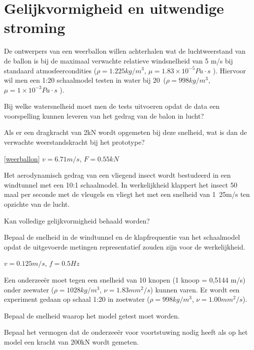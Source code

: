 \chapter{Gelijkvormigheid en uitwendige stroming}
\label{sec:Gelijkvormigheid en uitwendige stroming}
	\begin{toepassing}[*]
		\label{weerballon}
		De ontwerpers van een weerballon willen achterhalen wat de luchtweerstand van de ballon is bij de maximaal verwachte relatieve windsnelheid van 5 m/s bij standaard atmosfeercondities ($\rho = 1.225\unit{kg/m^3}$, $\mu = 1.83\times 10^{-5}\unit{Pa \cdot s}$ ).
		Hiervoor wil men een 1:20 schaalmodel testen in water bij 20\degC\ ($\rho = 998\unit{kg/m^3}$, $\mu = 1\times 10^{-3}\unit{Pa \cdot s}$ ). 
		
		Bij welke watersnelheid moet men de tests uitvoeren opdat de data een voorspelling kunnen leveren van het gedrag van de balon in lucht? 
		
		Als er een dragkracht van 2\unit{kN} wordt opgemeten bij deze snelheid, wat is dan de verwachte weerstandskracht bij het prototype?
	\end{toepassing}
	\begin{antwoord}{\ref{weerballon}}
		$v = 6.71\unit{m/s}$, $F = 0.55\unit{kN}$
	\end{antwoord}
	\begin{toepassing}[*]
		\label{insect}
		Het aerodynamisch gedrag van een vliegend insect wordt bestudeerd in een windtunnel met een 10:1 schaalmodel. In werkelijkheid klappert het insect 50 maal per seconde met de vleugels en vliegt het met een snelheid van \unit{1.25}{m/s} ten opzichte van de lucht. 
		
		Kan volledige gelijkvormigheid behaald worden?
		
		Bepaal de snelheid in de windtunnel en de klapfrequentie van het schaalmodel opdat de uitgevoerde metingen representatief zouden zijn voor de werkelijkheid.
	\end{toepassing}
	\begin{antwoord}
		$v = 0.125\unit{m/s}$, $f = 0.5\unit{Hz}$
	\end{antwoord}
	\begin{toepassing}[*]
		\label{onderzeeer}	
		Een onderzeeër moet tegen een snelheid van 10 knopen (1 knoop = 0,5144 m/s) onder zeewater ($\rho = 1028\unit{kg/m^3}$, $\nu = 1.83\unit{mm^2/s}$) kunnen varen. Er wordt een experiment gedaan op schaal 1:20 in zoetwater ($\rho = 998\unit{kg/m^3}$, $\nu = 1.00\unit{mm^2/s}$).
		
		Bepaal de snelheid waarop het model getest moet worden.
		
		Bepaal het vermogen dat de onderzeeër voor voortstuwing nodig heeft als op het model een kracht van 200\unit{kN} wordt gemeten.
	\end{toepassing}
